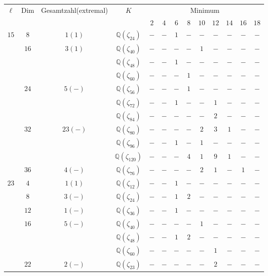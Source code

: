 \documentclass[12pt,a4paper,halfparskip,headsepline,bibtotocnumbered]{scrreprt}
\theoremstyle{nummermitklammern}
\theoremstyle{nonumberbreak}
\newcommand{\Q}{\mathbb{Q}}
\begin{document}
\begin{table}
	\centering
	\begin{tabular}{|c|c|c|c|c|c|c|c|c|c|c|c|c|}
		\hline		
		\multirow{2}{*}{$\ell$}	&\multirow{2}{*}{Dim}	&\multirow{2}{*}{Gesamtzahl(extremal)}	&\multirow{2}{*}{$K$}	&\multicolumn{9}{c|}{Minimum}\\ \cline{5-13}
								&						&							&					&$2$	&$4$	&$6$	&$8$	&$10$	&$12$	&$14$	&$16$	&$18$\\ \hline
		\multirow{10}{*}{$15$}	&$8$					&$1(1)$						&$\Q(\zeta_{24})$	&$-$	&$-$	&$1$	&$-$	&$-$	&$-$	&$-$	&$-$	&$-$\\ \cline{2-13}
								&\multirow{3}{*}{$16$}	&\multirow{3}{*}{$3(1)$}	&$\Q(\zeta_{40})$	&$-$	&$-$	&$-$	&$-$	&$1$	&$-$	&$-$	&$-$	&$-$\\ \cline{4-13}
								&						&							&$\Q(\zeta_{48})$	&$-$	&$-$	&$1$	&$-$	&$-$	&$-$	&$-$	&$-$	&$-$\\ \cline{4-13}
								&						&							&$\Q(\zeta_{60})$	&$-$	&$-$	&$-$	&$1$	&$-$	&$-$	&$-$	&$-$	&$-$\\ \cline{2-13}
								&\multirow{3}{*}{$24$}	&\multirow{3}{*}{$5(-)$}	&$\Q(\zeta_{56})$	&$-$	&$-$	&$-$	&$1$	&$-$	&$-$	&$-$	&$-$	&$-$\\ \cline{4-13}
								&						&							&$\Q(\zeta_{72})$	&$-$	&$-$	&$1$	&$-$	&$-$	&$1$	&$-$	&$-$	&$-$\\ \cline{4-13}
								&						&							&$\Q(\zeta_{84})$	&$-$	&$-$	&$-$	&$-$	&$-$	&$2$	&$-$	&$-$	&$-$\\ \cline{2-13}
								&\multirow{3}{*}{$32$}	&\multirow{3}{*}{$23(-)$}	&$\Q(\zeta_{80})$	&$-$	&$-$	&$-$	&$-$	&$2$	&$3$	&$1$	&$-$	&$-$\\ \cline{4-13}
								&						&							&$\Q(\zeta_{96})$	&$-$	&$-$	&$1$	&$-$	&$1$	&$-$	&$-$	&$-$	&$-$\\ \cline{4-13}
								&						&							&$\Q(\zeta_{120})$	&$-$	&$-$	&$-$	&$4$	&$1$	&$9$	&$1$	&$-$	&$-$\\ \cline{2-13}
								&$36$					&$4(-)$						&$\Q(\zeta_{76})$	&$-$	&$-$	&$-$	&$-$	&$2$	&$1$	&$-$	&$1$	&$-$\\ \hline
		\multirow{7}{*}{$23$}	&$4$					&$1(1)$						&$\Q(\zeta_{12})$	&$-$	&$-$	&$1$	&$-$	&$-$	&$-$	&$-$	&$-$	&$-$\\ \cline{2-13}
								&$8$					&$3(-)$						&$\Q(\zeta_{24})$	&$-$	&$-$	&$1$	&$2$	&$-$	&$-$	&$-$	&$-$	&$-$\\ \cline{2-13}
								&$12$					&$1(-)$						&$\Q(\zeta_{36})$	&$-$	&$-$	&$1$	&$-$	&$-$	&$-$	&$-$	&$-$	&$-$\\ \cline{2-13}
								&\multirow{3}{*}{$16$}	&\multirow{3}{*}{$5(-)$}	&$\Q(\zeta_{40})$	&$-$	&$-$	&$-$	&$-$	&$1$	&$-$	&$-$	&$-$	&$-$\\ \cline{4-13}
								&						&							&$\Q(\zeta_{48})$	&$-$	&$-$	&$1$	&$2$	&$-$	&$-$	&$-$	&$-$	&$-$\\ \cline{4-13}
								&						&							&$\Q(\zeta_{60})$	&$-$	&$-$	&$-$	&$-$	&$-$	&$1$	&$-$	&$-$	&$-$\\ \cline{2-13}
								&$22$					&$2(-)$						&$\Q(\zeta_{23})$	&$-$	&$-$	&$-$	&$-$	&$-$	&$2$	&$-$	&$-$	&$-$\\  \hline
	\end{tabular}
\end{table}
\end{document}

